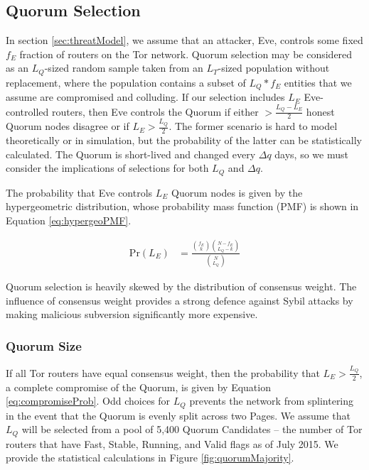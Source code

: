 \documentclass[conference]{IEEEtran}
\begin{document}
\subsection{Quorum Selection}
\label{sec:QSelection}

In section \ref{sec:threatModel}, we assume that an attacker, Eve, controls some fixed $ f_{E} $ fraction of routers on the Tor network. Quorum selection may be considered as an $ L_{Q} $-sized random sample taken from an $ L_{T} $-sized population without replacement, where the population contains a subset of $ L_{Q} * f_{E} $ entities that we assume are compromised and colluding. If our selection includes $ L_{E} $ Eve-controlled routers, then Eve controls the Quorum if either $ > \frac{L_{Q} - L_{E}}{2} $ honest Quorum nodes disagree or if $ L_{E} > \frac{L_{Q}}{2} $. The former scenario is hard to model theoretically or in simulation, but the probability of the latter can be statistically calculated. The Quorum is short-lived and changed every $ \Delta q $ days, so we must consider the implications of selections for both $ L_{Q} $ and $ \Delta q $.

The probability that Eve controls $ L_{E} $ Quorum nodes is given by the hypergeometric distribution, whose probability mass function (PMF) is shown in Equation \ref{eq:hypergeoPMF}.

\begin{align}
	\mathrm{Pr}(L_{E}) &= \frac{\binom{f_{E}}{k}\binom{N - f_{E}}{L_{Q} - k}}{\binom{N}{L_{Q}}}
	\label{eq:hypergeoPMF}
\end{align}

Quorum selection is heavily skewed by the distribution of consensus weight. The influence of consensus weight provides a strong defence against Sybil attacks by making malicious subversion significantly more expensive.

\subsubsection{Quorum Size}
\label{sec:qSize}

If all Tor routers have equal consensus weight, then the probability that $ L_{E} > \frac{L_{Q}}{2} $, a complete compromise of the Quorum, is given by Equation \ref{eq:compromiseProb}. Odd choices for $ L_{Q} $ prevents the network from splintering in the event that the Quorum is evenly split across two Pages. We assume that $ L_{Q} $ will be selected from a pool of 5,400 Quorum Candidates -- the number of Tor routers that have Fast, Stable, Running, and Valid flags as of July 2015\cite{TorMetrics}. We provide the statistical calculations in Figure \ref{fig:quorumMajority}.
\end{document}
